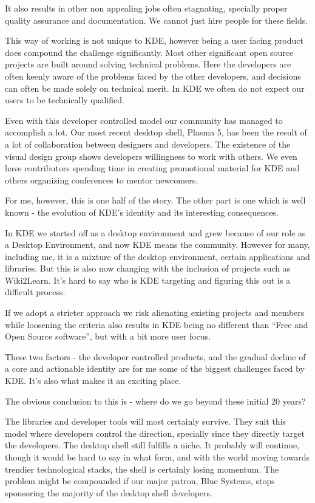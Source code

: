 It also results in other non appealing jobs often stagnating, specially proper quality assurance and documentation. We cannot just hire people for these fields.

This way of working is not unique to KDE, however being a user facing product does compound the challenge significantly. Most other significant open source projects are built around solving technical problems. Here the developers are often keenly aware of the problems faced by the other developers, and decisions can often be made solely on technical merit. In KDE we often do not expect our users to be technically qualified.

Even with this developer controlled model our community has managed to accomplish a lot. Our most recent desktop shell, Plasma 5, has been the result of a lot of collaboration between designers and developers. The existence of the visual design group shows developers willingness to work with others. We even have contributors spending time in creating promotional material for KDE and others organizing conferences to mentor newcomers.

For me, however, this is one half of the story. The other part is one which is well known - the evolution of KDE’s identity and its interesting consequences.

In KDE we started off as a desktop environment and grew because of our role as a Desktop Environment, and now KDE means the community. However for many, including me, it is a mixture of the desktop environment, certain applications and libraries. But this is also now changing with the inclusion of projects such as Wiki2Learn. It’s hard to say who is KDE targeting and figuring this out is a difficult process.

If we adopt a stricter approach we risk alienating existing projects and members while loosening the criteria also results in KDE being no different than “Free and Open Source software”, but with a bit more user focus. 

These two factors - the developer controlled products, and the gradual decline of a core and actionable identity are for me some of the biggest challenges faced by KDE. It’s also what makes it an exciting place.

The obvious conclusion to this is - where do we go beyond these initial 20 years?

The libraries and developer tools will most certainly survive. They suit this model where developers control the direction, specially since they directly target the developers. The desktop shell still fulfills a niche. It probably will continue, though it would be hard to say in what form, and with the world moving towards trendier technological stacks, the shell is certainly losing momentum. The problem might be compounded if our major patron, Blue Systems, stops sponsoring the majority of the desktop shell developers.

